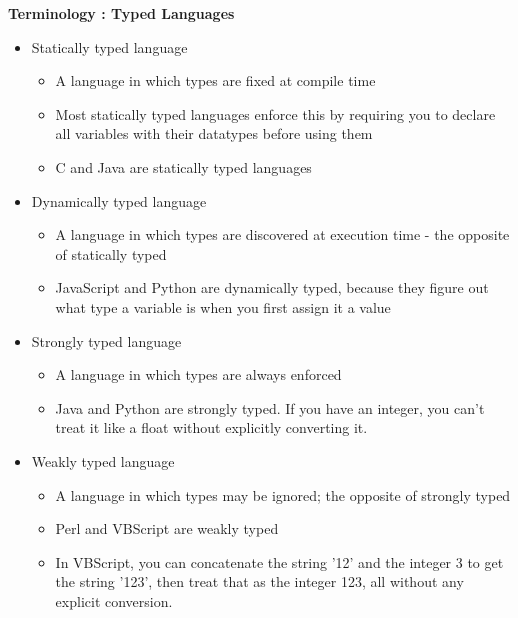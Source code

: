 \documentclass{beamer}
\begin{document}
\begin{frame}
 
\textbf{Terminology : Typed Languages}
 

\begin{itemize}
\item Statically typed language 

\begin{itemize}
\item A language in which types are fixed at compile time
\item Most statically typed languages enforce this by requiring you to declare all variables with their datatypes before using them 
\item C and Java are statically typed languages
\end{itemize}

\item Dynamically typed language 
\begin{itemize}
\item A language in which types are discovered at execution time - the opposite of statically typed
\item JavaScript and Python are dynamically typed, because they figure out what type a variable is when you first assign it a value 
\end{itemize}
\end{itemize}
\end{frame}

\begin{frame}
\begin{itemize}
\item Strongly typed language 

\begin{itemize}
\item A language in which types are always enforced
\item Java and Python are strongly typed. If you have an integer, you can't treat it like a float without explicitly converting it. 
\end{itemize}
\item Weakly typed language 

\begin{itemize}
\item A language in which types may be ignored; the opposite of strongly typed 
\item Perl and VBScript are weakly typed 
\item In VBScript, you can concatenate the string '12' and the integer 3 to get the string '123', then treat that as the integer 123, all without any explicit conversion. 
\end{itemize}
\end{itemize}
\end{frame}
\end{document}
